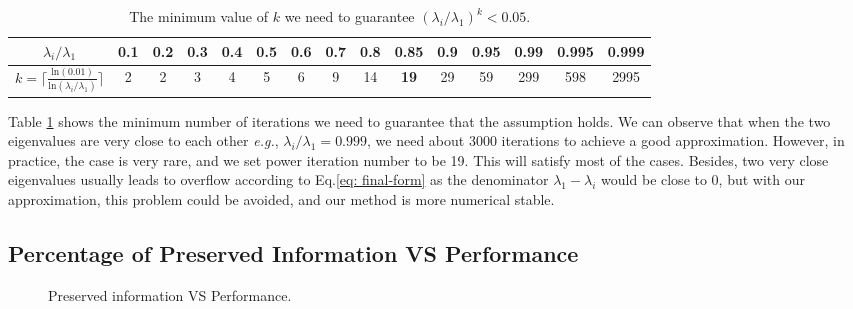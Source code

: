 \documentclass{article}
\begin{document}
\begin{table}[!htb]
\begin{center}
\setlength\tabcolsep{4pt}
\begin{tabular}{ccccccccccccccc}
\hline
$\lambda_i/\lambda_1$ & 0.1& 0.2& 0.3 & 0.4 & 0.5 & 0.6 & 0.7 & 0.8 & \textbf{0.85} & 0.9 & 0.95 & 0.99 & 0.995 & 0.999 \\ \hline
$k = \lceil \frac{\text{ln}(0.01)}{\text{ln}(\lambda_i/\lambda_1)} \rceil $   & 2 & 2 & 3 & 4 & 5 & 6 & 9 & 14  & \textbf{19}   & 29  & 59   & 299  & 598   & 2995  \\ \hline
\end{tabular}
\caption{The minimum value of $k$ we need to guarantee $(\lambda_i/\lambda_1)^k<0.05$.}
\label{tab: kmin}
\end{center}
\end{table}

Table \ref{tab: kmin} shows the minimum number of iterations we need to guarantee that the assumption holds. We can observe that when the two eigenvalues are very close to each other \emph{e.g.}, $\lambda_i/\lambda_1=0.999$, we need about 3000 iterations to achieve a good approximation. However, in practice, the case is very rare, and we set power iteration number to be 19. This will satisfy most of the cases. Besides, two very close eigenvalues usually leads to overflow according to Eq.\ref{eq: final-form} as the denominator $\lambda_1 - \lambda_i$ would be close to 0, but with our approximation, this problem could be avoided, and our method is more numerical stable.

\subsection{Percentage of Preserved Information VS Performance}

\begin{figure}[!htb]
\begin{floatrow}
{%
  \caption{Preserved information VS Performance.}%
}
\end{floatrow}
\end{figure}
\end{document}
